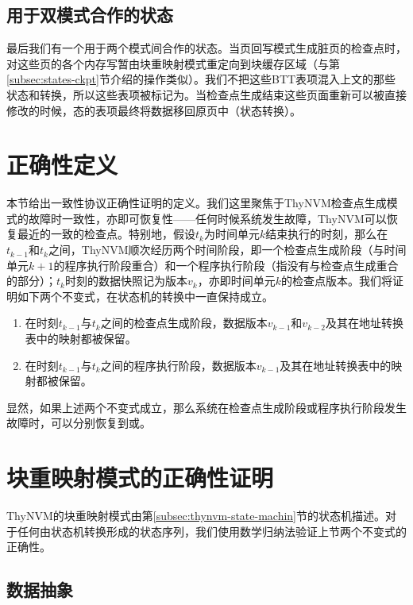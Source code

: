 \subsection{用于双模式合作的状态}

最后我们有一个用于两个模式间合作的状态。当页回写模式生成脏页的检查点时，对这些页的各个内存写暂由块重映射模式重定向到块缓存区域（与第\ref{subsec:states-ckpt}节介绍的操作类似）。我们不把这些BTT表项混入上文的那些状态和转换，所以这些表项被标记为。当检查点生成结束这些页面重新可以被直接修改的时候，态的表项最终将数据移回原页中（状态转换）。

\section{正确性定义}

本节给出一致性协议正确性证明的定义。我们这里聚焦于ThyNVM检查点生成模式的故障时一致性，亦即可恢复性——任何时候系统发生故障，ThyNVM可以恢复最近的一致的检查点。特别地，假设$t_k$为时间单元$k$结束执行的时刻，那么在$t_{k-1}$和$t_k$之间，ThyNVM顺次经历两个时间阶段，即一个检查点生成阶段（与时间单元$k+1$的程序执行阶段重合）和一个程序执行阶段（指没有与检查点生成重合的部分）；$t_k$时刻的数据快照记为版本$v_k$，亦即时间单元$k$的检查点版本。我们将证明如下两个不变式，在状态机的转换中一直保持成立。

\begin{enumerate}
\item \label{invar-ckpt} 在时刻$t_{k-1}$与$t_k$之间的检查点生成阶段，数据版本$v_{k-1}$和$v_{k-2}$及其在地址转换表中的映射都被保留。
\item \label{invar-exec} 在时刻$t_{k-1}$与$t_k$之间的程序执行阶段，数据版本$v_{k-1}$及其在地址转换表中的映射都被保留。
\end{enumerate}

显然，如果上述两个不变式成立，那么系统在检查点生成阶段或程序执行阶段发生故障时，可以分别恢复到{\cp}或{\cl}。

\section{块重映射模式的正确性证明}

ThyNVM的块重映射模式由第\ref{subsec:thynvm-state-machin}节的状态机描述。对于任何由状态机转换形成的状态序列，我们使用数学归纳法\cite{Hopcroft:ALC:2006}验证上节两个不变式的正确性。

\subsection{数据抽象}

